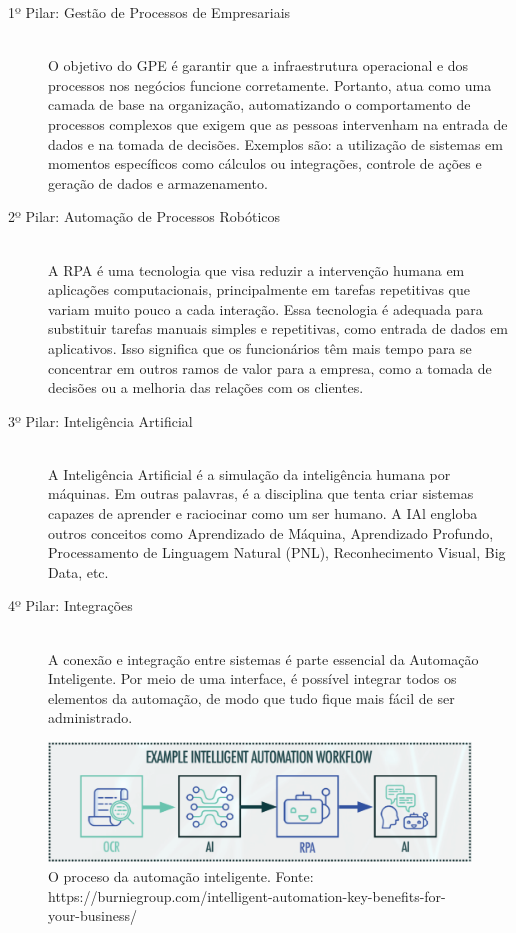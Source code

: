 \documentclass[a4paper,12pt]{article}
\begin{document}
\begin{description}
  \item[1º Pilar: Gestão de Processos de Empresariais] \hfill \\ O objetivo do GPE é garantir que a infraestrutura operacional e dos processos nos negócios funcione corretamente. Portanto, atua como uma camada de base na organização, automatizando o comportamento de processos complexos que exigem que as pessoas intervenham na entrada de dados e na tomada de decisões. Exemplos são: a utilização de sistemas em momentos específicos como cálculos ou integrações, controle de ações e geração de dados e armazenamento.
  
  
  \item[2º Pilar: Automação de Processos Robóticos ] \hfill \\ A RPA é uma tecnologia que visa reduzir a intervenção humana em aplicações computacionais, principalmente em tarefas repetitivas que variam muito pouco a cada interação. Essa tecnologia é adequada para substituir tarefas manuais simples e repetitivas, como entrada de dados em aplicativos. Isso significa que os funcionários têm mais tempo para se concentrar em outros ramos de valor para a empresa, como a tomada de decisões ou a melhoria das relações com os clientes.
  
  
  \item[3º Pilar: Inteligência Artificial ] \hfill \\ A Inteligência Artificial é a simulação da inteligência humana por máquinas.
Em outras palavras, é a disciplina que tenta criar sistemas capazes de aprender e raciocinar como um ser humano. A IAl engloba outros conceitos como Aprendizado de Máquina, Aprendizado Profundo, Processamento de Linguagem Natural (PNL), Reconhecimento Visual, Big Data, etc.

\item[4º Pilar: Integrações] \hfill \\ A conexão e integração entre sistemas é parte essencial da Automação Inteligente. Por meio de uma interface, é possível integrar todos os elementos da automação, de modo que tudo fique mais fácil de ser administrado.

\end{description}

	\begin{figure}[h!]
	\centering
  \includegraphics[scale=0.27]{automationworkflow}
  
   \tiny{ \caption{ O proceso da automação inteligente. Fonte: https://burniegroup.com/intelligent-automation-key-benefits-for-your-business/ }}
	\end{figure}
	
\end{document}
